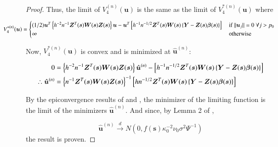 \documentclass[authoryear, review, 11pt]{elsarticle}
\begin{document}
\begin{proof}
        Thus, the limit of $V_4^{(n)} (\bm{u})$ is the same as the limit of $V_4^{*(n)} (\bm{u})$ where

        \begin{equation*}
            \mkern-72muV_4^{*(n)} (\bm{u}) = \begin{cases}(1/2) \bm{u}^T \left\{ h^{-2} n^{-1} \bm{Z}^T(\bm{s}) \bm{W}(\bm{s}) \bm{Z}(\bm{s}) \right\} \bm{u} - \bm{u}^T \left[ h^{-1} n^{-1/2} \bm{Z}^T(\bm{s}) \bm{W}(\bm{s}) \left\{ \bm{Y} - \bm{Z}(\bm{s}) \bm{\beta}(\bm{s}) \right\} \right] &\mbox{ if } \| \bm{u}_j \| = 0 \; \forall j > p_0 \\ \infty &\mbox{ otherwise } \end{cases}
        \end{equation*}


        Now, $V_4^{*(n)}(\bm{u})$ is convex and is minimized at $\hat{\bm{u}}^{(n)}$:

        \begin{align} \label{eq:limit}
            0 &=  \left\{ h^{-2} n^{-1} \bm{Z}^T(\bm{s}) \bm{W}(\bm{s}) \bm{Z}(\bm{s}) \right\} \hat{\bm{u}}^{(n)} - \left[ h^{-1} n^{-1/2} \bm{Z}^T(\bm{s}) \bm{W}(\bm{s}) \left\{ \bm{Y} - \bm{Z}(\bm{s}) \bm{\beta}(\bm{s}) \right\} \right] \notag \\
            \therefore \hat{\bm{u}}^{(n)} &= \left\{ n^{-1} \bm{Z}^T(\bm{s}) \bm{W}(\bm{s}) \bm{Z}(\bm{s}) \right\}^{-1} \left[ h n^{-1/2} \bm{Z}^T(\bm{s}) \bm{W}(\bm{s}) \left\{ \bm{Y} - \bm{Z}(\bm{s}) \bm{\beta}(\bm{s}) \right\} \right] \notag \\
        \end{align}

        By the epiconvergence results of \cite{Geyer-1994} and \cite{Knight-Fu-2000}, the minimizer of the limiting function is the limit of the minimizers $\hat{\bm{u}}^{(n)}$. And since, by Lemma 2 of \cite{Sun-Yan-Zhang-Lu-2014}, 

        \begin{equation}
            \hat{\bm{u}}^{(n)} \xrightarrow{d} N \left(0, f(\bm{s}) \kappa_0^{-2} \nu_0 \sigma^2 \Psi^{-1} \right)
        \end{equation}
        the result is proven.
            
    \end{proof}
\end{document}
